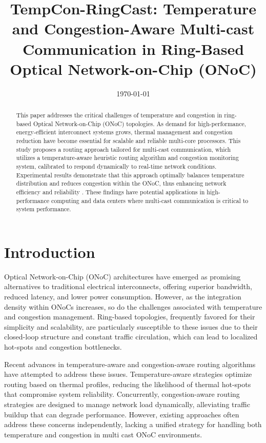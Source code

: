 \documentclass[conference]{IEEEtran}
\title{TempCon-RingCast: Temperature and Congestion-Aware Multi-cast Communication in Ring-Based Optical Network-on-Chip (ONoC)}
\author{
    \IEEEauthorblockN{Abubeker Yasmin Mustefa\IEEEauthorrefmark{1}}
    \IEEEauthorblockA{\IEEEauthorrefmark{1}Department of Computer science, China Three Gorges University, Yichang , China\\
    Email: moli614360@gmail.com}
}
\date{\today}
\begin{document}
\maketitle

\begin{abstract}
This paper addresses the critical challenges of temperature and congestion in ring-based Optical Network-on-Chip (ONoC) topologies. As demand for high-performance, energy-efficient interconnect systems grows, thermal management and congestion reduction have become essential for scalable and reliable multi-core processors. This study proposes a routing approach tailored for multi-cast communication, which utilizes a temperature-aware heuristic routing algorithm and congestion monitoring system, calibrated to respond dynamically to real-time network conditions. Experimental results demonstrate that this approach optimally balances temperature distribution and reduces congestion within the ONoC, thus enhancing network efficiency and reliability \cite{yang2020survey}. These findings have potential applications in high-performance computing and data centers where multi-cast communication is critical to system performance.
\end{abstract}

\section{Introduction}
Optical Network-on-Chip (ONoC) architectures have emerged as promising alternatives to traditional electrical interconnects, offering superior bandwidth, reduced latency, and lower power consumption. However, as the integration density within ONoCs increases, so do the challenges associated with temperature and congestion management. Ring-based topologies, frequently favored for their simplicity and scalability, are particularly susceptible to these issues due to their closed-loop structure and constant traffic circulation, which can lead to localized hot-spots and congestion bottlenecks.

Recent advances in temperature-aware and congestion-aware routing algorithms have attempted to address these issues. Temperature-aware strategies optimize routing based on thermal profiles, reducing the likelihood of thermal hot-spots that compromise system reliability. Concurrently, congestion-aware routing strategies are designed to manage network load dynamically, alleviating traffic buildup that can degrade performance. However, existing approaches often address these concerns independently, lacking a unified strategy for handling both temperature and congestion in multi cast ONoC environments.\cite{9091547} 
\end{document}
